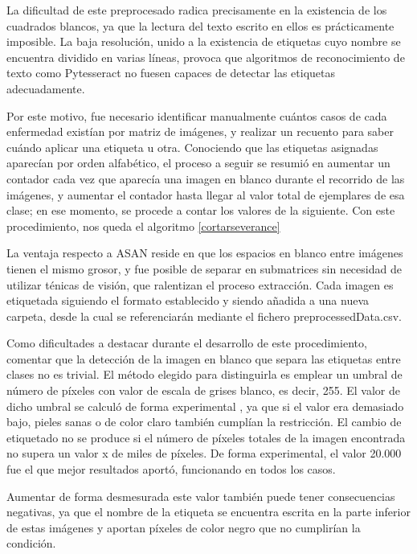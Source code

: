  La dificultad de este preprocesado radica precisamente en la existencia de los cuadrados blancos, ya que la lectura del texto escrito en ellos es prácticamente imposible. La baja resolución, unido a la existencia de etiquetas cuyo nombre se encuentra dividido en varias líneas, provoca que algoritmos de reconocimiento de texto como Pytesseract \cite {pytesseract} no fuesen capaces de detectar las etiquetas adecuadamente.
 
 Por este motivo, fue necesario identificar manualmente cuántos casos de cada enfermedad existían por matriz de imágenes, y realizar un recuento para saber cuándo aplicar una etiqueta u otra. Conociendo que las etiquetas asignadas aparecían por orden alfabético, el proceso a seguir se resumió en aumentar un contador cada vez que aparecía una imagen en blanco durante el recorrido de las imágenes, y aumentar el contador hasta llegar al valor total de ejemplares de esa clase; en ese momento, se procede a contar los valores de la siguiente. Con este procedimiento, nos queda el algoritmo \ref{cortarseverance}
  
La ventaja respecto a ASAN reside en que los espacios en blanco entre imágenes tienen el mismo grosor, y fue posible de separar en submatrices sin necesidad de utilizar ténicas de visión, que ralentizan el proceso extracción. Cada imagen es etiquetada siguiendo el formato establecido  y siendo añadida a una nueva carpeta, desde la cual se referenciarán mediante el fichero preprocessedData.csv. 

Como dificultades a destacar durante el desarrollo de este procedimiento, comentar que la detección de la imagen en blanco que separa las etiquetas entre clases no es trivial. El método elegido para distinguirla es emplear un  umbral de número de píxeles con valor de escala de grises blanco, es decir, 255. El valor de dicho umbral se calculó de forma experimental , ya que si el valor era demasiado bajo, pieles sanas o de color claro también cumplían la restricción. El cambio de etiquetado no se produce si el número de píxeles totales de la imagen encontrada no supera un valor x de miles de píxeles. De forma experimental, el valor 20.000 fue el que mejor resultados aportó, funcionando en todos los casos.

Aumentar de forma desmesurada este valor también puede tener consecuencias negativas, ya que el nombre de la etiqueta se encuentra escrita en la parte inferior de estas imágenes y aportan píxeles de color negro que no cumplirían la condición.


